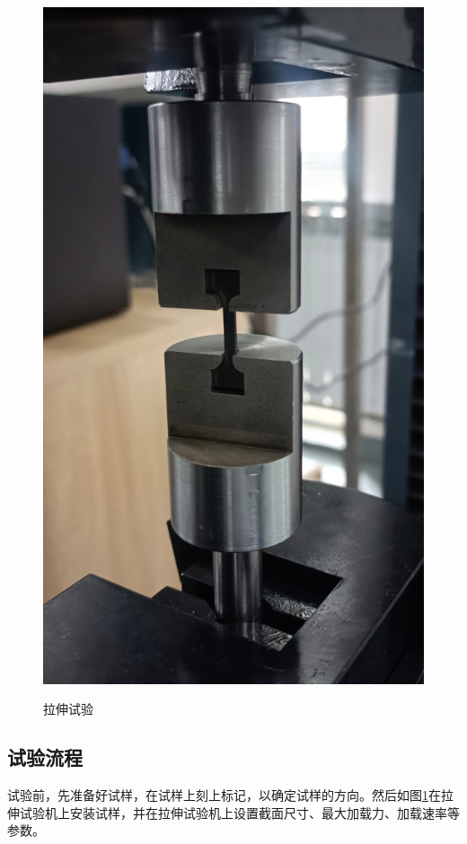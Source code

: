 \begin{figure}[h!]
{		\includegraphics[scale=0.4]{pic/拉伸试验}}
	\caption{拉伸试验}
	\label{fig:拉伸试验}
\end{figure}

\subsection{试验流程}
试验前，先准备好试样，在试样上刻上标记，以确定试样的方向。然后如图\ref{fig:拉伸试验}在拉伸试验机上安装试样，并在拉伸试验机上设置截面尺寸、最大加载力、加载速率等参数。

